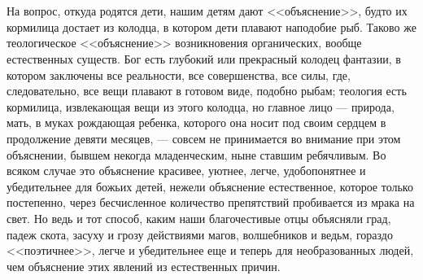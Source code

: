 \documentclass[12pt,oneside]{book}
\begin{document}
\chapter{}

На вопрос, откуда родятся дети, нашим детям дают <<объяснение>>, будто их кормилица достает из колодца, в котором дети плавают наподобие рыб. Таково же теологическое <<объяснение>> возникновения органических, вообще естественных существ. Бог есть глубокий или прекрасный колодец фантазии, в котором заключены все реальности, все совершенства, все силы, где, следовательно, все вещи плавают в готовом виде, подобно рыбам; теология есть кормилица, извлекающая вещи из этого колодца, но главное лицо --- природа, мать, в муках рождающая ребенка, которого она носит под своим сердцем в продолжение девяти месяцев, --- совсем не принимается во внимание при этом объяснении, бывшем некогда младенческим, ныне ставшим ребячливым. Во всяком случае это объяснение красивее, уютнее, легче, удобопонятнее и убедительнее для божьих детей, нежели объяснение естественное, которое только постепенно, через бесчисленное количество препятствий пробивается из мрака на свет. Но ведь и тот способ, каким наши благочестивые отцы объясняли град, падеж скота, засуху и грозу действиями магов, волшебников и ведьм, гораздо <<поэтичнее>>, легче и убедительнее еще и теперь для необразованных людей, чем объяснение этих явлений из естественных причин.

\chapter{}
\end{document}
